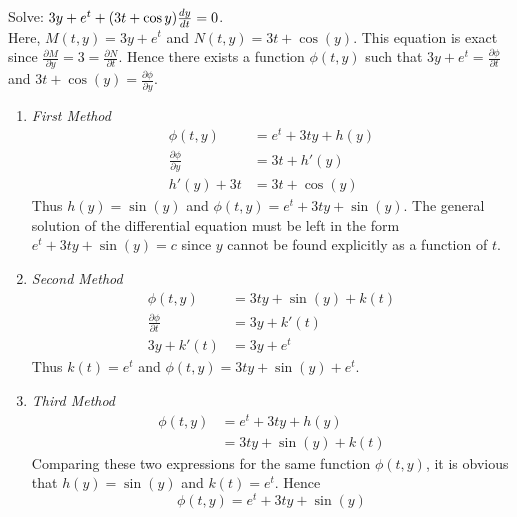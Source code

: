 \documentclass[12pt]{article}
\begin{document}
\begin{example} Solve: $3y + e^t + (3t + \cos y) \frac{dy}{dt} = 0$. \\ Here, $M(t, y) = 3y + e^t$ and $N(t, y) = 3t + \cos(y)$. This equation is exact since $\frac{\partial M}{\partial y} = 3 = \frac{\partial N}{\partial t} $. Hence there exists a function $\phi(t, y)$ such that $3y + e^t = \frac{\partial \phi}{\partial t}$ and $3t + \cos(y) = \frac{\partial \phi}{\partial y}$. \begin{enumerate} 
\item \textit{First Method} $$\begin{aligned} \phi(t, y) &= e^t + 3ty + h(y) \\ \frac{\partial \phi}{\partial y} &= 3t + h'(y) \\ h'(y) + 3t &= 3t + \cos(y) \end{aligned} $$ Thus $h(y) = \sin(y)$ and $\phi(t, y) = e^t + 3ty + \sin(y)$. The general solution of the differential equation must be left in the form $e^t + 3ty + \sin(y) = c$ since $y$ cannot be found explicitly as a function of $t$. 
\item \textit{Second Method} $$\begin{aligned} \phi(t, y) &= 3ty + \sin(y) + k(t) \\ \frac{\partial \phi}{\partial t} &= 3y + k'(t) \\ 3y + k'(t) &= 3y + e^t \end{aligned} $$ Thus $k(t) = e^t$ and $\phi(t, y) = 3ty + \sin(y) + e^t$. 
\item \textit{Third Method} $$\begin{aligned} \phi(t, y) &= e^t + 3ty + h(y) \\ &= 3ty + \sin(y) + k(t) \end{aligned} $$ Comparing these two expressions for the same function $\phi(t, y)$, it is obvious that $h(y) = \sin(y)$ and $k(t) = e^t$. Hence $$\phi(t, y) = e^t + 3ty + \sin(y) $$ \end{enumerate} \end{example} 
\end{document}
